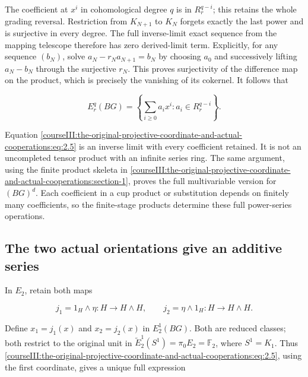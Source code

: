 The coefficient at \(x^i\) in cohomological degree \(q\) is in \(R_r^{q-i}\); this retains the whole grading reversal. Restriction from \(K_{N+1}\) to \(K_N\) forgets exactly the last power and is surjective in every degree. The full inverse-limit exact sequence from the mapping telescope therefore has zero derived-limit term. Explicitly, for any sequence \((b_N)\), solve \(a_N-r_Na_{N+1}=b_N\) by choosing \(a_0\) and successively lifting \(a_N-b_N\) through the surjective \(r_N\). This proves surjectivity of the difference map on the product, which is precisely the vanishing of its cokernel. It follows that

\begin{equation}
E_r^q(BG)=\left\{\sum_{i\geq0}a_i x^i:
                         a_i\in R_r^{q-i}\right\}.
 \label{courseIII:the-original-projective-coordinate-and-actual-cooperations:eq:2.5}
\end{equation}

Equation \eqref{courseIII:the-original-projective-coordinate-and-actual-cooperations:eq:2.5} is an inverse limit with every coefficient retained. It is not an uncompleted tensor product with an infinite series ring. The same argument, using the finite product skeleta in \cref{courseIII:the-original-projective-coordinate-and-actual-cooperations:section-1}, proves the full multivariable version for \((BG)^d\). Each coefficient in a cup product or substitution depends on finitely many coefficients, so the finite-stage products determine these full power-series operations.

\subsection{The two actual orientations give an additive series}
\label{courseIII:the-original-projective-coordinate-and-actual-cooperations:projective-actual-coordinate}

\label{courseIII:the-original-projective-coordinate-and-actual-cooperations:section-3}\label{courseIII:projective-coop:3}

In \(E_2\), retain both maps

\begin{equation}
j_1=1_H\wedge\eta:H\longrightarrow H\wedge H,
 \qquad j_2=\eta\wedge1_H:H\longrightarrow H\wedge H.
 \label{courseIII:the-original-projective-coordinate-and-actual-cooperations:eq:3.1}
\end{equation}

Define \(x_1=j_1(x)\) and \(x_2=j_2(x)\) in \(E_2^1(BG)\). Both are reduced classes; both restrict to the original unit in \(\widetilde E_2^1(S^1)=\pi_0E_2=\mathbb F_2\), where \(S^1=K_1\). Thus \eqref{courseIII:the-original-projective-coordinate-and-actual-cooperations:eq:2.5}, using the first coordinate, gives a unique full expression

